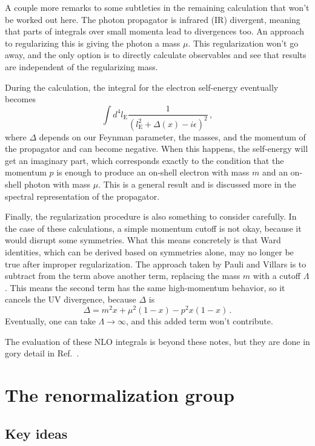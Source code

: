 \documentclass[12pt]{memoir}
\begin{document}
A couple more remarks to some subtleties in the remaining calculation that won't be worked out here.
The photon propagator is infrared (IR) divergent,
meaning that parts of integrals over small momenta lead to divergences too.
An approach to regularizing this is giving the photon a mass $\mu$.
This regularization won't go away, and the only option is to directly calculate observables
and see that results are independent of the regularizing mass.

During the calculation, the integral for the electron self-energy eventually becomes
\begin{equation}
  \int d^4l_{\text{E}} \frac{1}{(l_{\text{E}}^2 + \Delta(x) - i \epsilon)^2}\,,
\end{equation}
where $\Delta$ depends on our Feynman parameter, the masses, and the momentum of the propagator
and can become negative.
When this happens, the self-energy will get an imaginary part,
which corresponds exactly to the condition that the momentum $p$ is enough to produce an on-shell electron with mass $m$ and an on-shell photon with mass $\mu$.
This is a general result and is discussed more in the spectral representation of the propagator.

Finally, the regularization procedure is also something to consider carefully.
In the case of these calculations, a simple momentum cutoff is not okay, because it would disrupt some symmetries.
What this means concretely is that Ward identities,
which can be derived based on symmetries alone,
may no longer be true after improper regularization.
The approach taken by Pauli and Villars is to subtract from the term above another term,
replacing the mass $m$ with a cutoff $\Lambda$.
This means the second term has the same high-momentum behavior, so it cancels the UV divergence,
because $\Delta$ is
\begin{equation}
  \Delta = m^2 x + \mu^2 (1 - x) - p^2 x (1 - x)\,.
\end{equation}
Eventually, one can take $\Lambda \rightarrow \infty$, and this added term won't contribute.

The evaluation of these NLO integrals is beyond these notes,
but they are done in gory detail in Ref.~\cite{Peskin:1995ev}.

\chapter{The renormalization group}

\section{Key ideas}
\end{document}
